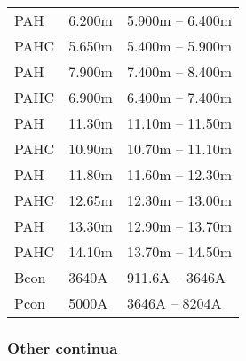 \begin{table}
\begin{tabular}{lll}
 PAH  & 6.200m & 5.900m -- 6.400m\\ 
 PAHC & 5.650m & 5.400m -- 5.900m\\ 
 PAH  & 7.900m & 7.400m -- 8.400m\\ 
 PAHC & 6.900m & 6.400m -- 7.400m\\ 
 PAH  & 11.30m & 11.10m -- 11.50m\\ 
 PAHC & 10.90m & 10.70m -- 11.10m\\ 
 PAH  & 11.80m & 11.60m -- 12.30m\\ 
 PAHC & 12.65m & 12.30m -- 13.00m\\ 
 PAH  & 13.30m & 12.90m -- 13.70m\\ 
 PAHC & 14.10m & 13.70m -- 14.50m\\ 
 Bcon &  3640A & 911.6A --  3646A\\ 
 Pcon &  5000A &  3646A --  8204A\\ 
\hline
\end{tabular}
\end{table}

\subsubsection{Other continua}

